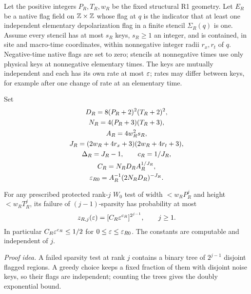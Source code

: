 \begin{lemma}\label{q1:l1}

Let the positive integers \(P_{R},T_{R},w_{R}\) be the fixed structural R1 geometry. Let \(E_{R}\) be a native flag field on \(\mathbb Z\times\mathbb Z\) whose flag at \(q\) is the indicator that at least one independent elementary depolarization flag in a finite stencil \(\Sigma_{R}(q)\) is one. Assume every stencil has at most \(s_{R}\) keys, \(s_{R}\ge 1\) an integer, and is contained, in site and macro-time coordinates, within nonnegative integer radii \(r_{x},r_{t}\) of \(q\). Negative-time native flags are set to zero; stencils at nonnegative times use only physical keys at nonnegative elementary times. The keys are mutually independent and each has its own rate at most \(\varepsilon\); rates may differ between keys, for example after one change of rate at an elementary time.

Set
\[
\begin{gathered}
D_{R} = 8(P_{R}+2)^{2}(T_{R}+2)^{2}, \\ N_{R} = 4(P_{R}+3)(T_{R}+3), \\ A_{R} = 4w_{R}^{2} s_{R}, \\ J_{R} = (2w_{R}+4r_{x}+3)(2w_{R}+4r_{t}+3), \\ \Delta_{R} = J_{R}-1,\qquad c_{R} = 1/J_{R}, \\ C_{R} = N_{R} D_{R} A_{R}^{1/J_{R}}, \\ \varepsilon_{R0} = A_{R}^{-1}(2N_{R} D_{R})^{-J_{R}}.
\end{gathered}
\]

For any prescribed protected rank-\(j\) \(W_0\) test of width \(<w_{R} P_{R}^{j}\) and height \(<w_{R} T_{R}^{j}\), its failure of \((j-1)\)-sparsity has probability at most
\[
\begin{gathered}
z_{R,j}(\varepsilon) = [C_{R} \varepsilon^{c_{R}}]^{2^{j-1}},\qquad j \ge  1.
\end{gathered}
\]
In particular \(C_{R} \varepsilon^{c_{R}} \le  1/2\) for \(0 \le  \varepsilon \le  \varepsilon_{R0}\). The constants are computable and independent of \(j\).

\end{lemma}
\par\noindent\emph{Proof idea.} A failed sparsity test at rank \(j\) contains a binary tree of \(2^{j-1}\) disjoint flagged regions. A greedy choice keeps a fixed fraction of them with disjoint noise keys, so their flags are independent; counting the trees gives the doubly exponential bound.

